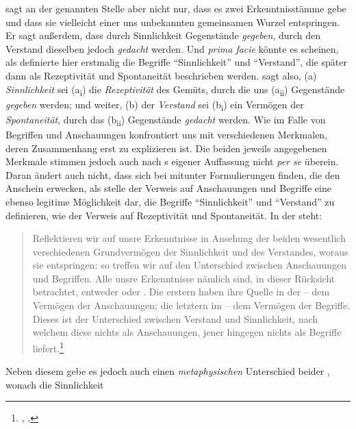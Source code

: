  sagt an der genannten Stelle aber nicht nur, dass es zwei
Erkenntnisstämme gebe und dass sie vielleicht einer uns unbekannten gemeinsamen
Wurzel entspringen. Er sagt außerdem, dass durch Sinnlichkeit Gegenstände
\emph{gegeben}, durch den Verstand dieselben jedoch \emph{gedacht} werden. Und
\emph{prima facie} könnte es scheinen, als definierte  hier
erstmalig die Begriffe \enquote{Sinnlichkeit} und \enquote{Verstand}, die später
dann als Rezeptivität und Spontaneität beschrieben werden.
 sagt also, (a) \emph{Sinnlichkeit} sei
(a\textsubscript{i}) die \emph{Rezeptivität} des Gemüts, durch die uns
(a\textsubscript{ii}) Gegenstände \emph{gegeben} werden; und weiter, (b) der
\emph{Verstand} sei (b\textsubscript{i}) ein Vermögen der \emph{Spontaneität},
durch das (b\textsubscript{ii}) Gegenstände \emph{gedacht} werden. Wie im Falle
von Begriffen und Anschauungen konfrontiert uns  mit
verschiedenen Merkmalen, deren Zusammenhang erst zu explizieren ist. Die beiden
jeweils angegebenen Merkmale stimmen jedoch auch nach s
eigener Auffassung nicht \emph{per se} überein.
Daran ändert auch nicht, dass sich bei  mitunter
Formulierungen finden, die den Anschein erwecken, als stelle der Verweis auf
Anschauungen und Begriffe eine ebenso legitime Möglichkeit dar, die Begriffe
\enquote{Sinnlichkeit} und \enquote{Verstand} zu definieren, wie der Verweis auf
Rezeptivität und Spontaneität. In der \jaeschelogik{} steht:
\begin{quote}
Reflektieren wir auf unsre Erkenntnisse in Ansehung der beiden wesentlich
verschiedenen Grundvermögen der Sinnlichkeit und des Verstandes, woraus sie
entspringen: so treffen wir auf den Unterschied zwischen Anschauungen und
Begriffen. Alle unsre Erkenntnisse nämlich sind, in dieser Rücksicht betrachtet,
entweder  oder . Die erstern haben ihre Quelle
in der  -- dem Vermögen der Anschauungen; die letztern im
 -- dem Vermögen der Begriffe. Dieses ist der 
Unterschied zwischen Verstand und Sinnlichkeit, nach welchem diese nichts als
Anschauungen, jener hingegen nichts als Begriffe
liefert.\footnote{\cite[][A 45]{Kant:ImmanuelKantsLogik1977},
\cite[][IX: 35.33--36.8]{Kant:GesammelteWerke1900ff.}.}
\end{quote}
Neben diesem  gebe es jedoch auch einen
\emph{metaphysischen} Unterschied beider , wonach die Sinnlichkeit
